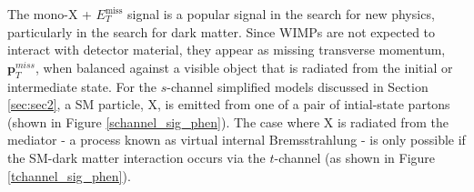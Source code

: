 \begin{flushleft}
The mono-X + $E_{T}^{\mathrm{miss}}$ signal is a popular signal in the search for new physics, particularly in the search for dark matter. Since WIMPs are not expected to interact with detector material, they appear as missing transverse momentum, $\mathbf{p}_{T}^{miss}$, when balanced against a visible object that is radiated from the initial or intermediate state. 
For the $s$-channel simplified models discussed in Section \ref{sec:sec2}, a SM particle, X, is emitted from one of a pair of intial-state partons (shown in Figure \ref{schannel_sig_phen}). The case where X is radiated from the mediator - a process known as virtual internal Bremsstrahlung - is only possible if the SM-dark matter interaction occurs via the $t$-channel (as shown in Figure \ref{tchannel_sig_phen}). 


\end{flushleft}
